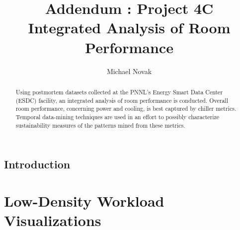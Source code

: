 \documentclass{report}
\title{Addendum : Project 4C \\Integrated Analysis of Room Performance}
\author{Michael Novak} %
\begin{document}
\maketitle




\begin{abstract}
Using postmortem datasets collected at the PNNL's Energy Smart Data Center (ESDC) facility, an integrated analysis of room performance is conducted. 
Overall room performance, concerning power and cooling, is best captured by chiller metrics.
Temporal data-mining techniques are used in an effort to possibly characterize sustainability measures of the patterns mined from these metrics. 



 \end{abstract}



\chapter*{Introduction}





\tableofcontents

\appendix

\part{Low-Density Workload Visualizations}
\end{document}
